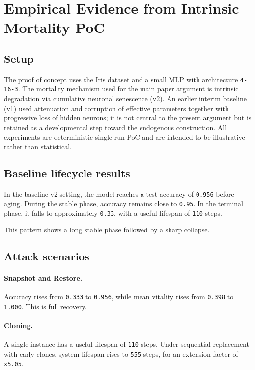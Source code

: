 \documentclass[11pt]{article}
\begin{document}
\appendix
\section{Empirical Evidence from Intrinsic Mortality PoC}

\subsection{Setup}

The proof of concept uses the Iris dataset and a small MLP with architecture \texttt{4-16-3}. The mortality mechanism used for the main paper argument is intrinsic degradation via cumulative neuronal senescence (v2). An earlier interim baseline (v1) used attenuation and corruption of effective parameters together with progressive loss of hidden neurons; it is not central to the present argument but is retained as a developmental step toward the endogenous construction. All experiments are deterministic single-run PoC and are intended to be illustrative rather than statistical.

\subsection{Baseline lifecycle results}

In the baseline v2 setting, the model reaches a test accuracy of \texttt{0.956} before aging. During the stable phase, accuracy remains close to \texttt{0.95}. In the terminal phase, it falls to approximately \texttt{0.33}, with a useful lifespan of \texttt{110} steps.

This pattern shows a long stable phase followed by a sharp collapse.

\subsection{Attack scenarios}

\paragraph{Snapshot and Restore.}
Accuracy rises from \texttt{0.333} to \texttt{0.956}, while mean vitality rises from \texttt{0.398} to \texttt{1.000}. This is full recovery.

\paragraph{Cloning.}
A single instance has a useful lifespan of \texttt{110} steps. Under sequential replacement with early clones, system lifespan rises to \texttt{555} steps, for an extension factor of \texttt{x5.05}.
\end{document}
